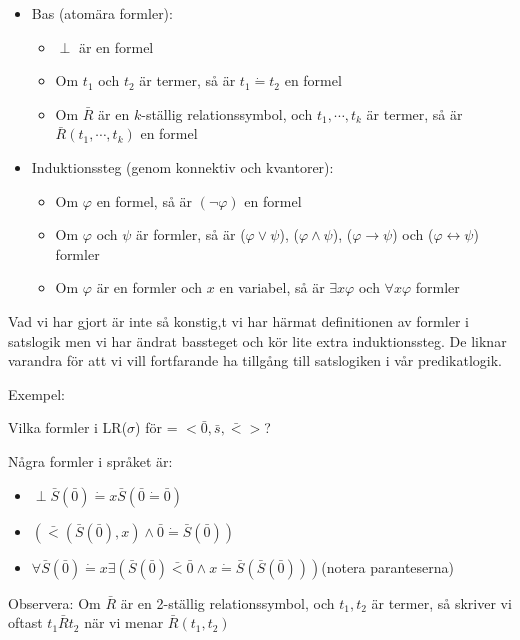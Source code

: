 \begin{itemize}
  \item Bas (atomära formler):
    \begin{itemize}
      \item $\perp$ är en formel
      \item Om $t_1$ och $t_2$ är termer, så är $t_1\dot{=} t_2$ en formel
      \item Om $\bar{R}$ är en $k$-ställig relationssymbol, och $t_1,\cdots, t_k$ är termer, så är $\bar{R}(t_1,\cdots,t_k)$ en formel
    \end{itemize}
  \item Induktionssteg (genom konnektiv och kvantorer):
    \begin{itemize}
      \item Om $\varphi$ en formel, så är $(\neg\varphi)$ en formel
      \item Om $\varphi$ och $\psi$ är formler, så är ($\varphi\vee\psi$), ($\varphi\wedge\psi$), ($\varphi\rightarrow\psi$) och ($\varphi\leftrightarrow\psi$) formler
      \item Om $\varphi$ är en formler och $x$ en variabel, så är $\exists x\varphi$ och $\forall x\varphi$ formler 
    \end{itemize}
\end{itemize}
\par\bigskip
\noindent Vad vi har gjort är inte så konstig,t vi har härmat definitionen av formler i satslogik men vi har ändrat bassteget och kör lite extra induktionssteg. De liknar varandra för att vi vill fortfarande ha tillgång till satslogiken i vår predikatlogik.
\par\bigskip
\noindent Exempel:\par
\noindent Vilka formler i LR($\sigma$) för  = $<\bar{0}, \bar{s}, \bar{<}>$?\par
Några formler i språket är:
\begin{itemize}
  \item $\perp$\qquad$\bar{S}(\bar{0})\dot{=}x$\qquad $\bar{S}(\bar{0}\dot{=}\bar{0})$
  \item $\left(\bar{<}(\bar{S}(\bar{0}), x)\wedge\bar{0}\dot{=}\bar{S}(\bar{0})\right)$
  \item $\forall\bar{S}(\bar{0})\dot{=} x$\qquad$\exists(\bar{S}(\bar{0})\bar{<}\bar{0}\wedge x\dot{=}\bar{S}(\bar{S}(\bar{0})))$\qquad (notera paranteserna)
\end{itemize}
\par\bigskip
\noindent Observera: Om $\bar{R}$ är en 2-ställig relationssymbol, och $t_1,t_2$ är termer, så skriver vi oftast $t_1 \bar{R} t_2$ när vi menar $\bar{R}(t_1,t_2)$
